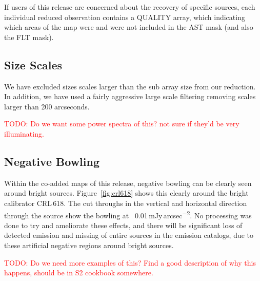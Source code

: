 \documentclass[twocolumn,times]{aastex6}
\newcommand{\todo}[1]{\textcolor{red}{TODO: #1}}
\newcommand{\jyas}{Jy\,arcsec\textsuperscript{$-$2}}
\begin{document}
If users of this release are concerned about the recovery of specific
sources, each individual reduced observation contains a QUALITY array,
which indicating which areas of the map were and were not included in
the AST mask (and also the FLT mask).


\subsection{Size Scales}
We have excluded sizes scales larger than the sub array size from our
reduction. In addition, we have used a fairly aggressive large scale
filtering removing scales larger than 200 arcseconds.

\todo{Do we want some power spectra of this? not sure if they'd be very illuminating.}

\subsection{Negative Bowling}
Within the co-added maps of this release, negative bowling can be
clearly seen around bright sources. Figure~\ref{fig:crl618} shows this
clearly around the bright calibrator CRL\,618. The cut throughs in the
vertical and horizontal direction through the source show the bowling
at ~0.01\,m\jyas. No processing was done to try and ameliorate these
effects, and there will be significant loss of detected emission and
missing of entire sources in the emission catalogs, due to these
artificial negative regions around bright sources.

\todo{Do we need more examples of this? Find a good description of why
  this happens, should be in S2 cookbook somewhere.}






\end{document}
